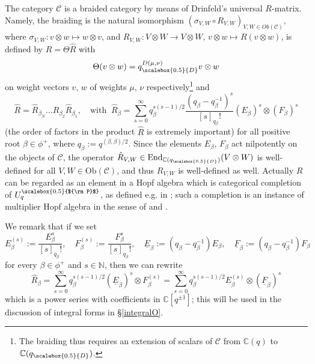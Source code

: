 \documentclass[11pt]{amsart}
\newcommand{\qD}{q_{\scalebox{0.5}{D}}}
\newcommand{\Pup}{{\scalebox{0.5}{${\rm P}$}}}
\begin{document}
\indent The category $\mathcal{C}$ is a braided category by means of Drinfeld's universal $R$-matrix. Namely, the braiding is the natural isomorphism $(\sigma_{V,W} \circ R_{V,W})_{V,W\in Ob(\mathcal{C})}$, where $\sigma_{V,W}\colon v\otimes w \mapsto w\otimes v$, and $R_{V,W}\colon V\otimes W \rightarrow V\otimes W$, $v\otimes w \mapsto R(v\otimes w)$, is defined by $R = \Theta \hat{R}$ with
\begin{equation}\label{thetadef}
\Theta(v\otimes w) = \qD^{D(\mu,\nu)} v\otimes w
\end{equation} on weight vectors $v$, $w$ of weights $\mu$, $\nu$ respectively\footnote{The braiding thus requires an extension of scalars of $\mathcal{C}$ from $\mathbb{C}(q)$ to $\mathbb{C}(\qD)$.} and
\begin{equation}\label{Rhat}
\hat{R} = \hat{R}_{\beta_N} \ldots \hat{R}_{\beta_2} \hat{R}_{\beta_1}, \quad \text{with } \: \hat{R}_{\beta} = \sum_{s=0}^{\infty} q_{\beta}^{s(s-1)/2}\frac{(q_{\beta} - q_{\beta}^{-1})^s}{[s]_{q_{\beta}}!} (E_{\beta})^s \otimes (F_{\beta})^s
\end{equation}
(the order of factors in the product $\hat{R}$ is extremely important) for all positive root $\beta \in \phi^+$, where $q_\beta := q^{(\beta,\beta)/2}$. Since the elements $E_{\beta}$, $F_{\beta}$ act nilpotently on the objects of $\mathcal{C}$, the operator $\hat{R}_{V,W} \in \mathrm{End}_{\mathbb{C}(\qD)}(V \otimes W)$ is well-defined for all $V,W\in \mathrm{Ob}(\mathcal{C})$, and thus $R_{V,W}$ is well-defined as well. Actually $R$ can be regarded as an element in a Hopf algebra which is categorical completion of $U_q^\Pup$, as defined e.g. in \cite[\S 2 and \S 3.2]{BR1}; such a completion is an instance of multiplier Hopf algebra in the sense of \cite{VD1} and \cite{VY}.

We remark that if we set
\[ E_{\beta}^{(s)} := \frac{E_{\beta}^s}{[s]_{q_{\beta}}!}, \quad F_{\beta}^{(s)} := \frac{F_{\beta}^s}{[s]_{q_{\beta}}!}, \quad \underline{E}_{\beta} := (q_\beta - q_\beta^{-1})E_\beta, \quad \underline{F}_{\beta} := (q_\beta - q_\beta^{-1})F_\beta \]
for every $\beta \in \phi^+$ and $s \in \mathbb{N}$, then we can rewrite
\begin{equation}\label{Rhatdiv}
\hat{R}_\beta = \sum_{s=0}^{\infty} q_{\beta}^{s(s-1)/2} (\underline{E}_{\beta})^s \otimes F_{\beta}^{(s)} = \sum_{s=0}^{\infty} q_{\beta}^{s(s-1)/2} E_{\beta}^{(s)} \otimes (\underline{F}_{\beta})^s
\end{equation} 
which is a power series with coefficients in $\mathbb{C}[q^{\pm 1}]$; this will be used in the discussion of integral forms in \S\ref{integralO}.
\end{document}
